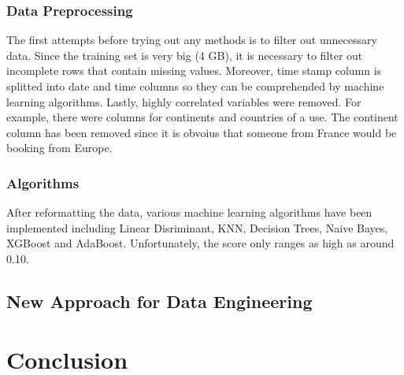 \documentclass[12pt]{report}
\begin{document}
\subsection{Data Preprocessing}
The first attempts before trying out any methods is to filter out unnecessary data. Since the training set is very big (4 GB), it is necessary to filter out incomplete rows that contain missing values. Moreover, time stamp column is splitted into date and time columns so they can be comprehended by machine learning algorithms. Lastly, highly correlated variables were removed. For example, there were columns for continents and countries of a use. The continent column has been removed since it is obvoius that someone from France would be booking from Europe. \\

\subsection{Algorithms}
After reformatting the data, various machine learning algorithms have been implemented including Linear Disriminant, KNN, Decision Trees, Naive Bayes, XGBoost and AdaBoost. Unfortunately, the score only ranges as high as around 0.10.

\section{New Approach for Data Engineering}



\chapter{Conclusion}
\end{document}
